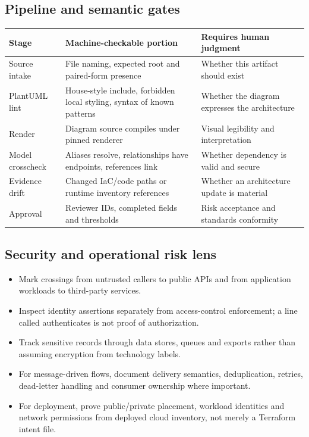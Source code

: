 \documentclass[10pt,letterpaper]{article}
\begin{document}
\subsection{Pipeline and semantic gates}
\begin{tabularx}{\linewidth}{@{}YYY@{}}\toprule
\textbf{Stage} & \textbf{Machine-checkable portion} & \textbf{Requires human judgment} \\ \midrule
Source intake & File naming, expected root and paired-form presence & Whether this artifact should exist \\
PlantUML lint & House-style include, forbidden local styling, syntax of known patterns & Whether the diagram expresses the architecture \\
Render & Diagram source compiles under pinned renderer & Visual legibility and interpretation \\
Model crosscheck & Aliases resolve, relationships have endpoints, references link & Whether dependency is valid and secure \\
Evidence drift & Changed IaC/code paths or runtime inventory references & Whether an architecture update is material \\
Approval & Reviewer IDs, completed fields and thresholds & Risk acceptance and standards conformity \\
\bottomrule\end{tabularx}

\subsection{Security and operational risk lens}
\begin{itemize}
\item Mark crossings from untrusted callers to public APIs and from application workloads to third-party services.
\item Inspect identity assertions separately from access-control enforcement; a line called authenticates is not proof of authorization.
\item Track sensitive records through data stores, queues and exports rather than assuming encryption from technology labels.
\item For message-driven flows, document delivery semantics, deduplication, retries, dead-letter handling and consumer ownership where important.
\item For deployment, prove public/private placement, workload identities and network permissions from deployed cloud inventory, not merely a Terraform intent file.
\end{itemize}
\end{document}
